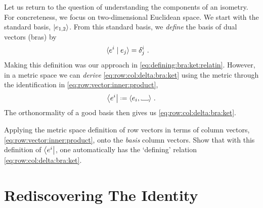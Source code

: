 \documentclass[12pt, oneside]{report}    %
\let\oldsection\section
\def\section{%
  \setcounter{sidenote}{1}%
  \oldsection
}
\begin{document}
Let us return to the question of understanding the components of an isometry. For concreteness, we focus on two-dimensional Euclidean space. We start with the standard basis, $\left|e_{1,2}\right\rangle$. From this standard basis, we \emph{define} the basis of dual vectors (bras) by
\begin{align}
    \langle e^i \mid e_j \rangle &= \delta^i_j \ .
    \label{eq:row:col:delta:bra:ket}
\end{align}
Making this definition was our approach in \eqref{eq:defining:bra:ket:relatin}. However, in a metric space we can \emph{derive} \eqref{eq:row:col:delta:bra:ket} using the metric through the identification in \eqref{eq:row:vector:inner:product},
\begin{align}
    \bra{e^i} \defeq \la e_i , \Vtextvisiblespace[1em]{} \ra \ .
    \label{eq:basis:dual:vectors:as:inner:prod}
\end{align}
The orthonormality of a good basis then gives us \eqref{eq:row:col:delta:bra:ket}.
\begin{exercise}
Applying the metric space definition of row vectors in terms of column vectors, \eqref{eq:row:vector:inner:product}, onto the \emph{basis} column vectors. Show that with this definition of $\left\langle e^i\right|$, one automatically has the `defining' relation \eqref{eq:row:col:delta:bra:ket}.
\end{exercise}

\section{Rediscovering The Identity}
\end{document}
